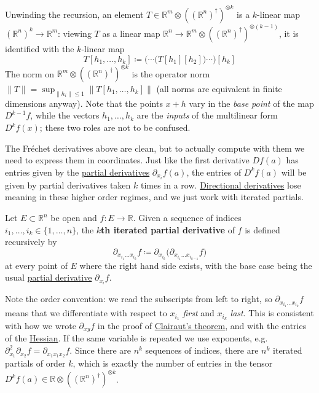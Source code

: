   Unwinding the recursion, an element $T \in \mathbb{R}^m \otimes ((\mathbb{R}^n)^\dagger)^{\otimes k}$ is a $k$-linear map $(\mathbb{R}^n)^k \to \mathbb{R}^m$: viewing $T$ as a linear map $\mathbb{R}^n \to \mathbb{R}^m \otimes ((\mathbb{R}^n)^\dagger)^{\otimes (k-1)}$, it is identified with the $k$-linear map
  \begin{equation}
    T[h_1, \ldots, h_k] \coloneqq \big( \cdots \big( T[h_1] [h_2] \big) \cdots \big) [h_k]
  \end{equation}
  The norm on $\mathbb{R}^m \otimes ((\mathbb{R}^n)^\dagger)^{\otimes k}$ is the operator norm $\|T\| = \sup_{\|h_i\| \leq 1} \|T[h_1, \ldots, h_k]\|$ (all norms are equivalent in finite dimensions anyway). Note that the points $x + h$ vary in the \textit{base point} of the map $D^{k-1} f$, while the vectors $h_1, \ldots, h_k$ are the \textit{inputs} of the multilinear form $D^k f(x)$; these two roles are not to be confused.

  The Fréchet derivatives above are clean, but to actually compute with them we need to express them in coordinates. Just like the first derivative $Df(a)$ has entries given by the \hyperref[def:partial-derivative]{partial derivatives} $\partial_{x_i} f(a)$, the entries of $D^k f(a)$ will be given by partial derivatives taken $k$ times in a row. \hyperref[def:directional-derivative]{Directional derivatives} lose meaning in these higher order regimes, and we just work with iterated partials. 

  \begin{definition}
    \label{def:kth-partial-derivative}
    Let $E \subset \mathbb{R}^n$ be open and $f: E \to \mathbb{R}$. Given a sequence of indices $i_1, \ldots, i_k \in \{1, \ldots, n\}$, the \textbf{$k$th iterated partial derivative} of $f$ is defined recursively by
    \begin{equation}
      \partial_{x_{i_1} \ldots x_{i_k}} f \coloneqq \partial_{x_{i_k}} \big( \partial_{x_{i_1} \ldots x_{i_{k-1}}} f \big)
    \end{equation}
    at every point of $E$ where the right hand side exists, with the base case being the usual \hyperref[def:partial-derivative]{partial derivative} $\partial_{x_i} f$.
  \end{definition}

  Note the order convention: we read the subscripts from left to right, so $\partial_{x_{i_1} \ldots x_{i_k}} f$ means that we differentiate with respect to $x_{i_1}$ \textit{first} and $x_{i_k}$ \textit{last}. This is consistent with how we wrote $\partial_{xy} f$ in the proof of \hyperref[thm:clairuts-theorem]{Clairaut's theorem}, and with the entries of the \hyperref[def:hessian]{Hessian}. If the same variable is repeated we use exponents, e.g. $\partial_{x_1}^2 \partial_{x_2} f = \partial_{x_1 x_1 x_2} f$. Since there are $n^k$ sequences of indices, there are $n^k$ iterated partials of order $k$, which is exactly the number of entries in the tensor $D^k f(a) \in \mathbb{R} \otimes ((\mathbb{R}^n)^\dagger)^{\otimes k}$.

